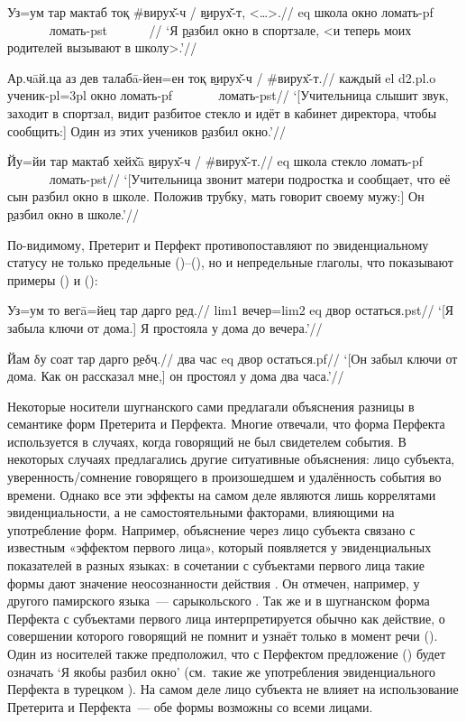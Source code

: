 {{{{
\begingl
\gla Уз=ум тар мактаб тоқ \#вирух̌-ч / \b{вирух̌-т}, <…>.//
 {\sc eq} школа окно ломать-{\sc pf} ~~~~~~ ломать-{\sc pst} ~~~~~~//
\glft ‘Я \b{разбил} окно в спортзале, <и теперь моих родителей вызывают в школу>.’//
\endgl \xe

\begingl
\gla Ар.чāй.ца аз дев талабā-йен=ен тоқ \b{вирух̌-ч} / \#вирух̌-т.//
\glc каждый {\sc el} {\sc d2.pl.o} ученик-{\sc pl=3pl} окно ломать-{\sc pf} ~~~~~~ ломать-{\sc pst}//
\glft ‘[Учительница слышит звук, заходит в спортзал, видит разбитое стекло и идёт в кабинет директора, чтобы сообщить:] Один из этих учеников \b{разбил} окно.’//
\endgl \xe

\begingl
\gla Йу=йи тар мактаб хейх̌ā \b{вирух̌-ч} / \#вирух̌-т.//
 {\sc eq} школа стекло ломать-{\sc pf} ~~~~~~ ломать-{\sc pst}//
\glft ‘[Учительница звонит матери подростка и сообщает, что её сын разбил окно в школе. Положив трубку, мать говорит своему мужу:] Он \b{разбил} окно в школе.’//
\endgl \xe

По-видимому, Претерит и Перфект противопоставляют по эвиденциальному статусу не только предельные ()–(), но и непредельные глаголы, что показывают примеры () и ():

\begingl
\gla Уз=ум то вегā=йец тар дарго \b{ред}.//
 {\sc lim1} вечер={\sc lim2} {\sc eq} двор остаться.{\sc pst}//
\glft ‘[Я забыла ключи от дома.] Я \b{простояла} у дома до вечера.’//
\endgl \xe

\begingl
\gla Йам δу соат тар дарго \b{реδҷ}.//
 два час {\sc eq} двор остаться.{\sc pf}//
\glft ‘[Он забыл ключи от дома. Как он рассказал мне,] он \b{простоял} у дома два часа.’//
\endgl \xe


Некоторые носители шугнанского сами предлагали объяснения разницы в семантике форм Претерита и Перфекта. Многие отвечали, что форма Перфекта используется в случаях, когда говорящий не был свидетелем события. В некоторых случаях предлагались другие ситуативные объяснения: лицо субъекта, уверенность/сомнение говорящего в произошедшем и удалённость события во времени. Однако все эти эффекты на самом деле являются лишь коррелятами эвиденциальности, а не самостоятельными факторами, влияющими на употребление форм. Например, объяснение через лицо субъекта связано с известным «эффектом первого лица», который появляется у эвиденциальных показателей в разных языках: в сочетании с субъектами первого лица такие формы дают значение неосознанности действия \parencite[220–223]{aikhenvald2004}. Он отмечен, например, у другого памирского языка~— сарыкольского \parencite[323]{kim2017}. Так же и в шугнанском форма Перфекта с субъектами первого лица интерпретируется обычно как действие, о совершении которого говорящий не помнит и узнаёт только в момент речи (). Один из носителей также предположил, что с Перфектом предложение () будет означать ‘Я якобы разбил окно’ (см.~такие же употребления эвиденциального Перфекта в турецком \parencite[101]{lewis2000}). На самом деле лицо субъекта не влияет на использование Претерита и Перфекта~— обе формы возможны со всеми лицами.

}}}}
